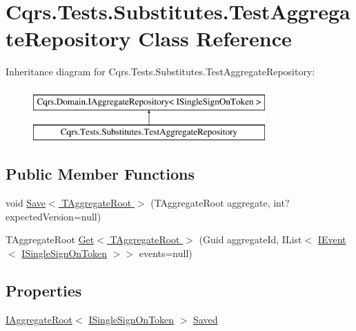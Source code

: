 \hypertarget{classCqrs_1_1Tests_1_1Substitutes_1_1TestAggregateRepository}{}\section{Cqrs.\+Tests.\+Substitutes.\+Test\+Aggregate\+Repository Class Reference}
\label{classCqrs_1_1Tests_1_1Substitutes_1_1TestAggregateRepository}
Inheritance diagram for Cqrs.\+Tests.\+Substitutes.\+Test\+Aggregate\+Repository\+:\begin{figure}[H]
\begin{center}
\leavevmode
\includegraphics[height=2.000000cm]{classCqrs_1_1Tests_1_1Substitutes_1_1TestAggregateRepository}
\end{center}
\end{figure}
\subsection*{Public Member Functions}
\begin{DoxyCompactItemize}
\item 
void \hyperlink{classCqrs_1_1Tests_1_1Substitutes_1_1TestAggregateRepository_aebe99ad9ba8ed487ff5ea04959578ed4}{Save$<$ T\+Aggregate\+Root $>$} (T\+Aggregate\+Root aggregate, int? expected\+Version=null)
\item 
T\+Aggregate\+Root \hyperlink{classCqrs_1_1Tests_1_1Substitutes_1_1TestAggregateRepository_a7c40bdfb962e659f8555f21f51659c0c}{Get$<$ T\+Aggregate\+Root $>$} (Guid aggregate\+Id, I\+List$<$ \hyperlink{interfaceCqrs_1_1Events_1_1IEvent}{I\+Event}$<$ \hyperlink{interfaceCqrs_1_1Authentication_1_1ISingleSignOnToken}{I\+Single\+Sign\+On\+Token} $>$$>$ events=null)
\end{DoxyCompactItemize}
\subsection*{Properties}
\begin{DoxyCompactItemize}
\item 
\hyperlink{interfaceCqrs_1_1Domain_1_1IAggregateRoot}{I\+Aggregate\+Root}$<$ \hyperlink{interfaceCqrs_1_1Authentication_1_1ISingleSignOnToken}{I\+Single\+Sign\+On\+Token} $>$ \hyperlink{classCqrs_1_1Tests_1_1Substitutes_1_1TestAggregateRepository_a5dae460d63c66ee005d2c11eb228388f}{Saved}
\end{DoxyCompactItemize}


